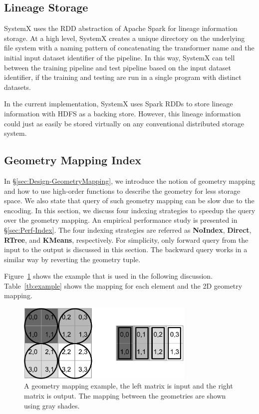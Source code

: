\documentclass{sig-alternate}
\begin{document}
\subsection{Lineage Storage}
SystemX uses the RDD abstraction of Apache Spark for lineage information storage. 
At a high level, SystemX creates a unique directory on the underlying file system with a naming pattern of 
concatenating the transformer name and the initial input dataset identifier of the pipeline.
In this way, SystemX can tell between the training pipeline and test pipeline based on the input dataset identifier,
if the training and testing are run in a single program with distinct datasets.

In the current implementation, SystemX uses Spark RDDs to store lineage information with HDFS as a backing store. 
However, this lineage information could just as easily be stored virtually on any conventional distributed storage system.


\subsection{Geometry Mapping Index}
\label{sec:GeometryIndex}
In \S\ref{sec:Design-GeometryMapping}, we introduce the notion of geometry mapping and how to use high-order functions
to describe the geometry for less storage space. 
We also state that query of such geometry mapping can be slow due to the encoding. 
In this section, we discuss four indexing strategies to speedup the query over the geometry mapping. 
An empirical performance study is presented in \S\ref{sec:Perf-Index}.
The four indexing strategies are referred as {\bf NoIndex}, {\bf Direct}, {\bf RTree}, and {\bf KMeans}, respectively.
For simplicity, only forward query from the input to the output is discussed in this section.
The backward query works in a similar way by reverting the geometry tuple.


Figure~\ref{fig:example} shows the example that is used in the following discussion.
Table~\ref{tb:example} shows the mapping for each element and the 2D geometry mapping.
\begin{figure}[h]
\begin{center}
    \includegraphics[width=85mm]{pictures/example}
\caption {A geometry mapping example, the left matrix is input and the right matrix is output. The mapping between the geometries are shown using gray shades.
    \label{fig:example}
}
\end{center}
\end{figure}
\end{document}
